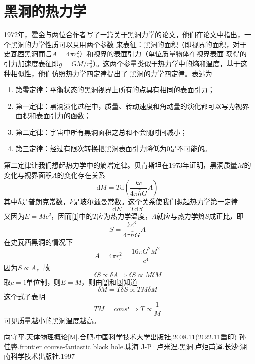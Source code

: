 \documentclass{article}
\renewcommand{\d}{\mathrm{d}}
\begin{document}
\section{黑洞的热力学}
1972年，霍金与两位合作者写了一篇关于黑洞力学的论文，他们在论文中指出，一个黑洞的力学性质可以只用两个参数
来表征：黑洞的面积（即视界的面积，对于史瓦西黑洞而言$A=4\pi r_s^2$）和视界的表面引力（单位质量物体在视界表面
获得的引力加速度表征即$g=GM/r_s^2$）。这两个参量类似于热力学中的熵和温度，基于这种相似性，他们仿照热力学四定律提出了
黑洞的力学四定律。表述为
\begin{enumerate}
    \item 第零定律：平衡状态的黑洞视界上所有的点具有相同的表面引力；
    \item 第一定律：黑洞演化过程中，质量、转动速度和角动量的演化都可以写为视界面积和表面引力的函数；
    \item 第二定律：宇宙中所有黑洞面积之总和不会随时间减小；
    \item 第三定律：经过有限次转换把黑洞表面引力降低为0是不可能的。
\end{enumerate}
第二定律让我们想起热力学中的熵增定律。贝肯斯坦在1973年证明，黑洞质量$M$的变化与视界面积$A$的变化存在关系
\begin{equation}
    \d M=T\d \left(\frac{kc}{4\pi\bar{h}G}A\right)
    \label{1}
\end{equation}
其中$\bar{h}$是普朗克常数，$k$是玻尔兹曼常数。这个关系使我们想起热力学第一定律
\begin{equation}
    \d E=T\d S
    \label{2}
\end{equation}
又因为$E=Mc^2$，因而\ref{1}中的$T$应为热力学温度，$A$就应与热力学熵$S$成正比，即
\begin{equation}
    S=\frac{kc^3}{4\pi\bar{h}G}A
\end{equation}
在史瓦西黑洞的情况下
\begin{equation}
    A=4\pi r_s^2=\frac{16\pi G^2M^2}{c^4}
\end{equation}
因为$S\propto A$，故
\begin{equation}
    \delta S\propto \delta A\Rightarrow \delta S\propto M\delta M
    \label{3}
\end{equation}
取$c=1$单位制，则$E=M$，则由\ref{2}和\ref{3}知道
\begin{equation}
    \delta M=T\delta S\propto TM\delta M
\end{equation}
这个式子表明
\begin{equation}
    TM=const\Rightarrow T\propto \frac{1}{M}
\end{equation}
可见质量越小的黑洞温度越高。
\begin{thebibliography}{最宽序号}
    向守平.天体物理概论[M].合肥:中国科学技术大学出版社,2008.11(2022.11重印)
    孙佳睿.frontier course-fantastic black hole.珠海
    J-P·卢米涅.黑洞.卢炬甫译.长沙:湖南科学技术出版社,1997
\end{thebibliography}
\end{document}
